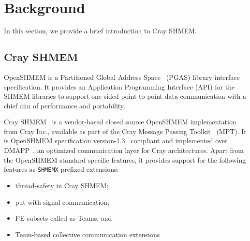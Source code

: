 \section{Background}
\label{src:bground}

In this section, we provide a brief introduction to Cray SHMEM.%

\subsection{Cray SHMEM}
\label{src:bg/crayshmem}
OpenSHMEM is a Partitioned Global Address Space~\cite{pgas} (PGAS) library
interface specification.%
It
provides an Application Programming Interface (API) for the SHMEM libraries
to support one-sided point-to-point data communication with a chief aim of
performance and portability. %

Cray SHMEM~\cite{csma} is a vendor-based
closed source OpenSHMEM implementation from Cray Inc., available as part of the
Cray Message Passing Toolkit~\cite{mpt} (MPT). It is OpenSHMEM
specification version-1.3~\cite{osm13} compliant and implemented over
DMAPP~\cite{dmapp}, an
optimized communication layer for Cray architectures. Apart from the OpenSHMEM standard
specific features, it provides support for the following features as \texttt{SHMEMX}
prefixed extensions:
\begin{itemize}
    \item thread-safety in Cray SHMEM;
    \item put with signal communication;
    \item PE subsets called as Teams; and
    \item Team-based collective communication extensions
\end{itemize}

